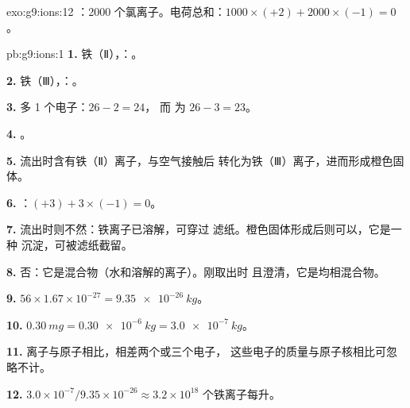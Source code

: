 \begin{solution}{exo:g9:ions:12}
：2000 个氯离子。电荷总和：$1000 \times (+2) + 2000 \times
(-1) = 0$。
\end{solution}

\begin{solution}{pb:g9:ions:1}
\textbf{1.} 铁（Ⅱ），：。

\textbf{2.} 铁（Ⅲ），：。

\textbf{3.}  多 1 个电子：$26 - 2 = 24$，
而  为 $26 - 3 = 23$。

\textbf{4.} 。

\textbf{5.} 流出时含有铁（Ⅱ）离子，与空气接触后
转化为铁（Ⅲ）离子，进而形成橙色固体。

\textbf{6.} ：$(+3) + 3 \times (-1) = 0$。

\textbf{7.} 流出时则不然：铁离子已溶解，可穿过
滤纸。橙色固体形成后则可以，它是一种
沉淀，可被滤纸截留。

\textbf{8.} 否：它是混合物（水和溶解的离子）。刚取出时
且澄清，它是均相混合物。

\textbf{9.} $56 \times 1.67 \times 10^{-27} = \qty{9.35e-26}{kg}$。

\textbf{10.} $\qty{0.30}{mg} = \qty{0.30e-6}{kg} = \qty{3.0e-7}{kg}$。

\textbf{11.} 离子与原子相比，相差两个或三个电子，
这些电子的质量与原子核相比可忽略不计。

\textbf{12.} $3.0 \times 10^{-7} / 9.35 \times 10^{-26} \approx 3.2
\times 10^{18}$ 个铁离子每升。
\end{solution}

